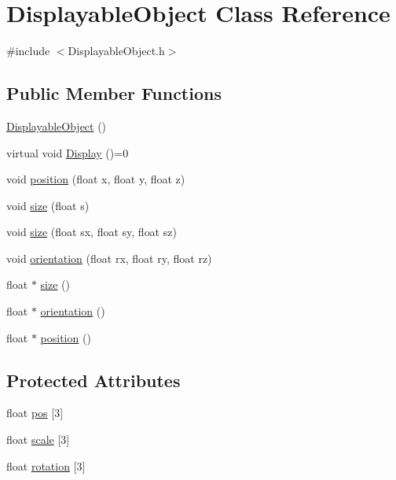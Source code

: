 \hypertarget{class_displayable_object}{}\section{Displayable\+Object Class Reference}
\label{class_displayable_object}


{\ttfamily \#include $<$Displayable\+Object.\+h$>$}

\subsection*{Public Member Functions}
\begin{DoxyCompactItemize}
\item 
\hyperlink{class_displayable_object_a2de32e213b8b7f16e72f385e8bf3c7e8}{Displayable\+Object} ()
\item 
virtual void \hyperlink{class_displayable_object_af1fe25dbf6950d41cbf9b99277d0d825}{Display} ()=0
\item 
void \hyperlink{class_displayable_object_afe2221908b0bf6746ae39d15a3422627}{position} (float x, float y, float z)
\item 
void \hyperlink{class_displayable_object_ae5da1215619f8119a2fa9b79bbc52534}{size} (float s)
\item 
void \hyperlink{class_displayable_object_ac199796e336d20345eabd48c5a8d559f}{size} (float sx, float sy, float sz)
\item 
void \hyperlink{class_displayable_object_a0101b77de7909105221c772e8b969d48}{orientation} (float rx, float ry, float rz)
\item 
float $\ast$ \hyperlink{class_displayable_object_ab321394a5a8fab049f6092051d0183cc}{size} ()
\item 
float $\ast$ \hyperlink{class_displayable_object_ac2bf3fd3c6e8c902e250c9df4b06dc1b}{orientation} ()
\item 
float $\ast$ \hyperlink{class_displayable_object_a5c50e13b8274882a8dcfe2582bb9c5df}{position} ()
\end{DoxyCompactItemize}
\subsection*{Protected Attributes}
\begin{DoxyCompactItemize}
\item 
float \hyperlink{class_displayable_object_a7cc44f282422020c02184f34861b6f7a}{pos} \mbox{[}3\mbox{]}
\item 
float \hyperlink{class_displayable_object_aedc1ec03b36a5be1b5ff6c27a361c6f6}{scale} \mbox{[}3\mbox{]}
\item 
float \hyperlink{class_displayable_object_a9f828c99272a0de1910c6ffb19b0f7d1}{rotation} \mbox{[}3\mbox{]}
\end{DoxyCompactItemize}


